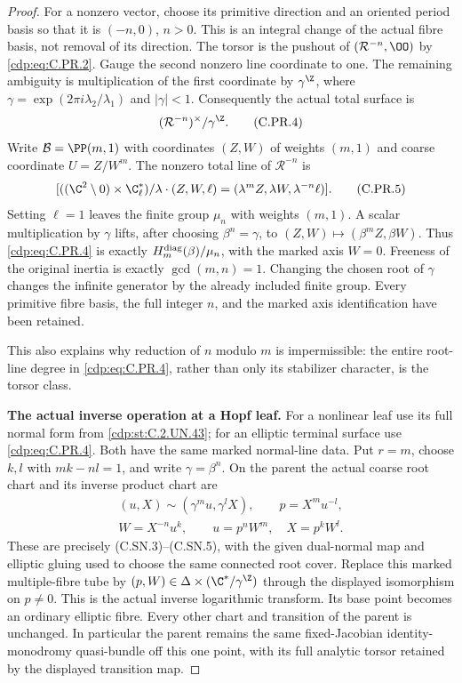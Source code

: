 \begin{proof}
For a nonzero vector, choose its primitive direction and an
oriented period basis so that it is $(-n,0)$, $n>0$. This is
an integral change of the actual fibre basis, not removal of
its direction. The torsor is the pushout of
$(\mathcal R^{-n},\OO)$ by \eqref{cdp:eq:C.PR.2}. Gauge the second nonzero
line coordinate to one. The remaining ambiguity is multiplication
of the first coordinate by
$\gamma^{\Z}$, where
$\gamma=\exp(2\pi i\lambda_2/\lambda_1)$ and $|\gamma|<1$.
Consequently the actual total surface is
\[
                         (\mathcal R^{-n})^\times/\gamma^{\Z}.
                                                        \tag{C.PR.4}\label{cdp:eq:C.PR.4}
\]
Write $\mathcal B=\PP(m,1)$ with coordinates $(Z,W)$ of
weights $(m,1)$ and coarse coordinate $U=Z/W^m$.
The nonzero total line of $\mathcal R^{-n}$ is
\[
 [((\C^2\setminus0)\times\C^*_\ell)/
              \lambda\cdot(Z,W,\ell)
                =(\lambda^mZ,\lambda W,\lambda^{-n}\ell)].
                                                        \tag{C.PR.5}\label{cdp:eq:C.PR.5}
\]
Setting $\ell=1$ leaves the finite group $\mu_n$ with weights
$(m,1)$. A scalar multiplication by $\gamma$ lifts, after choosing
$\beta^n=\gamma$, to $(Z,W)\mapsto(\beta^mZ,\beta W)$.
Thus \eqref{cdp:eq:C.PR.4} is exactly
$H_m^{\rm diag}(\beta)/\mu_n$, with the marked axis $W=0$.
Freeness of the original inertia is exactly
$\gcd(m,n)=1$. Changing the chosen root of $\gamma$ changes
the infinite generator by the already included finite group.
Every primitive fibre basis, the full integer $n$, and the marked
axis identification have been retained.

This also explains why reduction of $n$ modulo $m$ is impermissible:
the entire root-line degree in \eqref{cdp:eq:C.PR.4}, rather than only its
stabilizer character, is the torsor class.

\par\medskip\noindent\textbf{The actual inverse operation at a Hopf leaf.}
For a nonlinear leaf use its full normal form from \ref{cdp:st:C.2.UN.43};
for an elliptic terminal surface use \eqref{cdp:eq:C.PR.4}. Both have the
same marked normal-line data. Put $r=m$, choose $k,l$ with
$mk-nl=1$, and write $\gamma=\beta^n$. On the parent the
actual coarse root chart and its inverse product chart are
\[
 \begin{gathered}
 (u,X)\sim(\gamma^m u,\gamma^lX),\qquad p=X^m u^{-l},\\
 W=X^{-n}u^k,\qquad
                u=p^nW^m,\quad X=p^kW^l.
 \end{gathered}                                        \tag{C.PR.6}\label{cdp:eq:C.PR.6}
\]
These are precisely (C.SN.3)--(C.SN.5), with the given dual-normal
map and elliptic gluing used to choose the same connected root
cover. Replace this marked multiple-fibre tube by
$(p,W)\in\Delta\times(\C^*/\gamma^{\Z})$ through the displayed
isomorphism on $p\ne0$. This is the actual inverse logarithmic
transform. Its base point becomes an ordinary elliptic fibre.
Every other chart and transition of the parent is unchanged.
In particular the parent remains the same fixed-Jacobian
identity-monodromy quasi-bundle off this one point, with its full
analytic torsor retained by the displayed transition map.


\end{proof}
